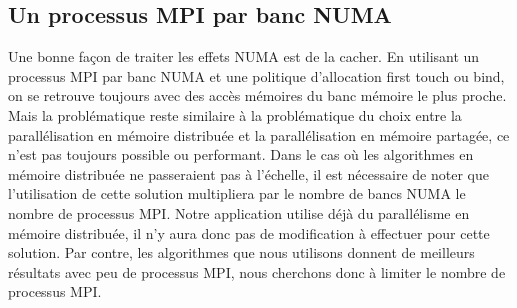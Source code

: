 \subsection{Un processus MPI par banc NUMA}
Une bonne façon de traiter les effets NUMA est de la cacher.
%
En utilisant un processus MPI par banc NUMA et une politique d'allocation first touch ou bind, on se retrouve toujours avec des accès mémoires du banc mémoire le plus proche.
%
Mais la problématique reste similaire à la problématique du choix entre la parallélisation en mémoire distribuée et la parallélisation en mémoire partagée, ce n'est pas toujours possible ou performant.
%
Dans le cas où les algorithmes en mémoire distribuée ne passeraient pas à l'échelle, il est nécessaire de noter que l'utilisation de cette solution multipliera par le nombre de bancs NUMA le nombre de processus MPI.
%
Notre application utilise déjà du parallélisme en mémoire distribuée, il n'y aura donc pas de modification à effectuer pour cette solution.
%
Par contre, les algorithmes que nous utilisons donnent de meilleurs résultats avec peu de processus MPI, nous cherchons donc à limiter le nombre de processus MPI.
